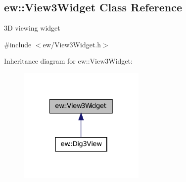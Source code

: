 \hypertarget{classew_1_1View3Widget}{
\subsection{ew::View3Widget Class Reference}
\label{classew_1_1View3Widget}
}


3D viewing widget  




{\ttfamily \#include $<$ew/View3Widget.h$>$}



Inheritance diagram for ew::View3Widget:
\nopagebreak
\begin{figure}[H]
\begin{center}
\leavevmode
\includegraphics[width=174pt]{classew_1_1View3Widget__inherit__graph}
\end{center}
\end{figure}
